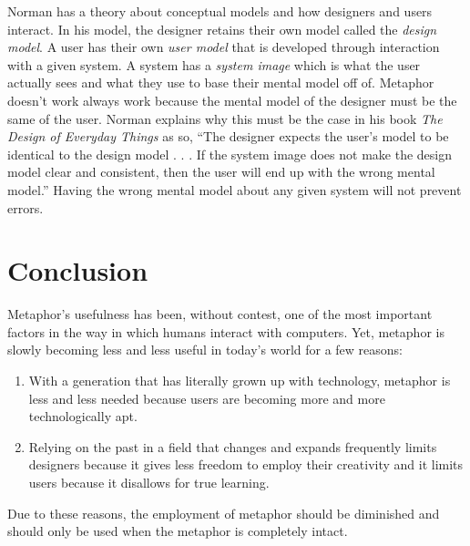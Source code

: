 \documentclass[11pt, oneside]{article}
\begin{document}
Norman has a theory about conceptual models and how designers and users interact. In his model, the designer retains their own model called the \textit{design model}. A user has their own \textit{user model} that is developed through interaction with a given system. A system has a \textit{system image} which is what the user actually sees and what they use to base their mental model off of.
Metaphor doesn't work always work because the mental model of the designer must be the same of the user. Norman explains why this must be the case in his book \textit{The Design of Everyday Things} as so, ``The designer expects the user's model to be identical to the design model . . . If the system image does not make the design model clear and consistent, then the user will end up with the wrong mental model.''\cite{design-everyday} Having the wrong mental model about any given system will not prevent errors.

\section{Conclusion}
Metaphor's usefulness has been, without contest, one of the most important factors in the way in which humans interact with computers. Yet, metaphor is slowly becoming less and less useful in today's world for a few reasons:
\begin{enumerate}
\item With a generation that has literally grown up with technology, metaphor is less and less needed because users are becoming more and more technologically apt.
\item Relying on the past in a field that changes and expands frequently limits designers because it gives less freedom to employ their creativity and it limits users because it disallows for true learning.
\end{enumerate}
Due to these reasons, the employment of metaphor should be diminished and should only be used when the metaphor is completely intact.

\pagebreak


\end{document}
